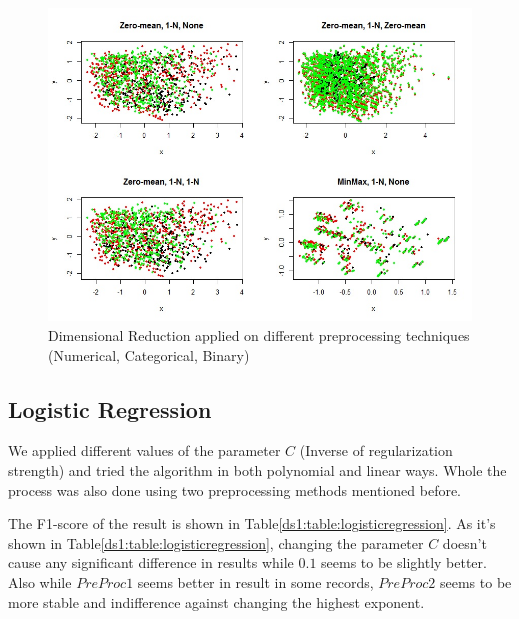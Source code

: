\begin{figure}[p]
\center
\includegraphics[scale=\figurescaling]{figures/db1/dim_reduction.jpg}
\caption{Dimensional Reduction applied on different preprocessing techniques (Numerical, Categorical, Binary)
\label{ds1:fig:dimred}}
\end{figure}


\subsection{Logistic Regression}
We applied different values of the parameter $C$ (Inverse of regularization strength) and tried the algorithm in both polynomial and linear ways. Whole the process was also done using two preprocessing methods mentioned before.

The F1-score of the result is shown in Table\ref{ds1:table:logisticregression}. As it's shown in Table\ref{ds1:table:logisticregression}, changing the parameter $C$ doesn't cause any significant difference in results while $0.1$ seems to be slightly better. Also while $PreProc1$ seems better in result in some records, $PreProc2$ seems to be more stable and indifference against changing the highest exponent.


